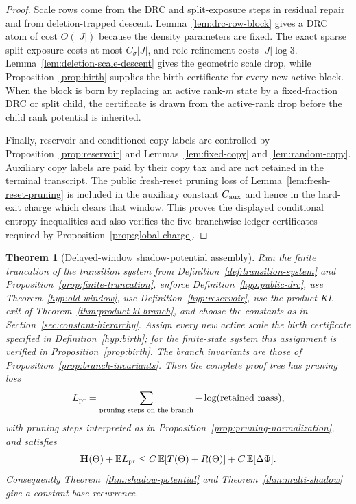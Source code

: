\documentclass[11pt]{article}
\newtheorem{theorem}{Theorem}[section]
\newcommand{\EE}{\mathbb E}
\newcommand{\bfH}{\mathbf H}
\begin{document}
\begin{proof}
Scale rows come from the DRC and split-exposure steps in residual repair and
from deletion-trapped descent.  Lemma~\ref{lem:drc-row-block} gives a DRC atom
of cost $O(|J|)$ because the density parameters are fixed.  The exact sparse
split exposure costs at most $C_\sigma |J|$, and role refinement costs
$|J|\log 3$.  Lemma~\ref{lem:deletion-scale-descent} gives the geometric
scale drop, while Proposition~\ref{prop:birth} supplies the birth certificate
for every new active block.  When the block is born by replacing an active
rank-$m$ state by a fixed-fraction DRC or split child, the certificate is drawn
from the active-rank drop before the child rank potential is inherited.

Finally, reservoir and conditioned-copy labels are controlled by
Proposition~\ref{prop:reservoir} and Lemmas~\ref{lem:fixed-copy} and
\ref{lem:random-copy}.  Auxiliary copy labels are paid by their copy tax and
are not retained in the terminal transcript.  The public fresh-reset pruning
loss of Lemma~\ref{lem:fresh-reset-pruning} is included in the auxiliary
constant $C_{\rm aux}$ and hence in the hard-exit charge which clears that
window.  This proves the displayed
conditional entropy inequalities and also verifies the five branchwise ledger
certificates required by Proposition~\ref{prop:global-charge}.
\end{proof}

\begin{theorem}[Delayed-window shadow-potential assembly]
\label{thm:assembly}
Run the finite truncation of the transition system from
Definition~\ref{def:transition-system} and Proposition~\ref{prop:finite-truncation},
enforce Definition~\ref{hyp:public-drc}, use Theorem~\ref{hyp:old-window},
use Definition~\ref{hyp:reservoir}, use the product-KL exit of
Theorem~\ref{thm:product-kl-branch}, and choose the constants as in
Section~\ref{sec:constant-hierarchy}.  Assign every new active scale the birth
certificate specified in Definition~\ref{hyp:birth}; for the finite-state
system this assignment is verified in Proposition~\ref{prop:birth}.  The
branch invariants are those of Proposition~\ref{prop:branch-invariants}.
Then
the complete proof tree has pruning loss
\[
  L_{\rm pr}
  =
  \sum_{\textup{pruning steps on the branch}} -\log(\textup{retained mass}),
\]
with pruning steps interpreted as in
Proposition~\ref{prop:pruning-normalization}, and satisfies
\[
  \bfH(\Theta)+\EE L_{\rm pr}
  \le
  C\,\EE[T(\Theta)+R(\Theta)]
  + C\,\EE[\Delta\Phi].
\]
Consequently Theorem~\ref{thm:shadow-potential} and
Theorem~\ref{thm:multi-shadow} give a constant-base recurrence.
\end{theorem}
\end{document}
